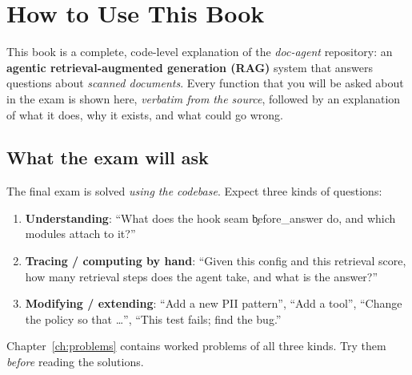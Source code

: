 \chapter*{How to Use This Book}
This book is a complete, code-level explanation of the \emph{doc-agent} repository: an \textbf{agentic retrieval-augmented generation (RAG)} system that answers questions about \emph{scanned documents}. Every function that you will be asked about in the exam is shown here, \emph{verbatim from the source}, followed by an explanation of what it does, why it exists, and what could go wrong.

\section*{What the exam will ask}
The final exam is solved \emph{using the codebase}. Expect three kinds of questions:
\begin{enumerate}
 \item \textbf{Understanding}: ``What does the hook seam \c{before\_answer} do, and which modules attach to it?''
 \item \textbf{Tracing / computing by hand}: ``Given this config and this retrieval score, how many retrieval steps does the agent take, and what is the answer?''
 \item \textbf{Modifying / extending}: ``Add a new PII pattern'', ``Add a tool'', ``Change the policy so that \dots'', ``This test fails; find the bug.''
\end{enumerate}
Chapter~\ref{ch:problems} contains worked problems of all three kinds. Try them \emph{before} reading the solutions.

